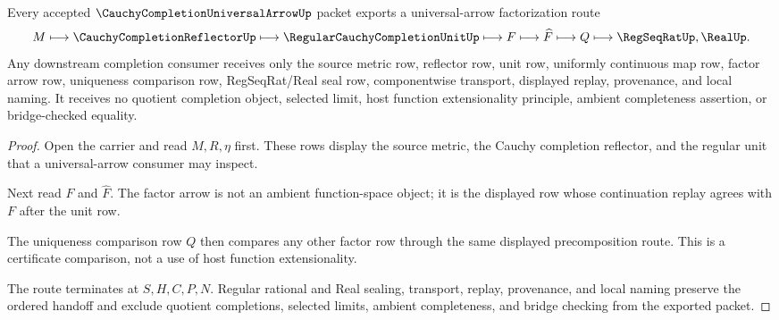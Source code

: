 \begin{theorem}
\label{thm:cauchy-completion-universal-arrow-factorization}
Every accepted $\CauchyCompletionUniversalArrowUp$ packet exports a universal-arrow factorization route
$$
M
\longmapsto
\CauchyCompletionReflectorUp
\longmapsto
\RegularCauchyCompletionUnitUp
\longmapsto
F
\longmapsto
\widehat{F}
\longmapsto
Q
\longmapsto
\RegSeqRatUp,\RealUp .
$$
Any downstream completion consumer receives only the source metric row, reflector row, unit row, uniformly continuous map row, factor arrow row, uniqueness comparison row, RegSeqRat/Real seal row, componentwise transport, displayed replay, provenance, and local naming. It receives no quotient completion object, selected limit, host function extensionality principle, ambient completeness assertion, or bridge-checked equality.
\end{theorem}
\begin{proof}
Open the carrier and read $M,R,\eta$ first. These rows display the source metric, the Cauchy completion reflector, and the regular unit that a universal-arrow consumer may inspect.

Next read $F$ and $\widehat{F}$. The factor arrow is not an ambient function-space object; it is the displayed row whose continuation replay agrees with $F$ after the unit row.

The uniqueness comparison row $Q$ then compares any other factor row through the same displayed precomposition route. This is a certificate comparison, not a use of host function extensionality.

The route terminates at $S,H,C,P,N$. Regular rational and Real sealing, transport, replay, provenance, and local naming preserve the ordered handoff and exclude quotient completions, selected limits, ambient completeness, and bridge checking from the exported packet.
\end{proof}


